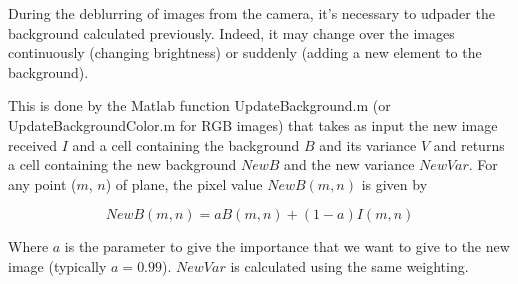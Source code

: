 During the deblurring of images from the camera, it's necessary to udpader the background calculated previously. Indeed, it may change over the images continuously (changing brightness) or  suddenly (adding a new element to the background). 

This is done by the Matlab function UpdateBackground.m (or UpdateBackgroundColor.m for RGB images) that takes as input the new image received $I$ and a cell containing the background $B$ and its variance $V$ and returns a cell containing the new background $NewB$ and the new variance $NewVar$. For any point ($m$, $n$) of plane, the pixel value $NewB(m,n)$ is given by

$$NewB(m,n) = a B(m,n) + (1-a) I(m,n)$$

Where $a$ is the parameter to give the importance that we want to give to the new image (typically $a = 0.99$).
$NewVar$ is calculated using the same weighting.